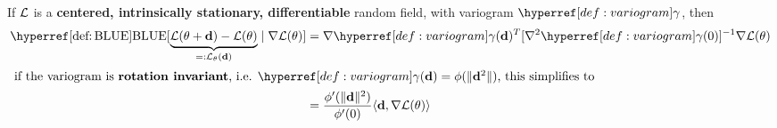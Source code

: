 
\begin{lemma}\label{lem: blue centered, intrinsically stationary}
	If \(\mathcal{L}\) is a \textbf{centered, intrinsically stationary, differentiable}
	random field, with variogram \(\variogram\), then
	\begin{align*}
		\BLUE[\underbrace{\Loss(\param+\step) - \Loss(\param)}_{=:\Loss_\param(\step)}
		\mid \grad\Loss(\param)]
		&=  \grad\variogram(\step)^T[\grad^2\variogram(0)]^{-1}
		\grad\Loss(\param)\\
		\intertext{
			if the variogram is \textbf{rotation invariant}, i.e.
			\(\variogram(\step)=\phi(\|\step^2\|)\), this simplifies to
		}
		&= \frac{\phi'(\|\step\|^2)}{\phi'(0)}
		\langle \step, \grad\Loss(\param)\rangle
	\end{align*}
\end{lemma}
